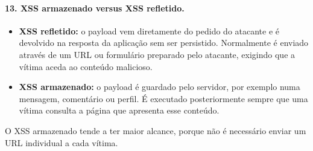 \documentclass[11pt,a4paper]{article}
\begin{document}

\paragraph{13. XSS armazenado versus XSS refletido.}
\begin{itemize}
\item \textbf{XSS refletido:} o payload vem diretamente do pedido do atacante e é devolvido na
resposta da aplicação sem ser persistido. Normalmente é enviado através de um URL ou formulário
preparado pelo atacante, exigindo que a vítima aceda ao conteúdo malicioso.
\item \textbf{XSS armazenado:} o payload é guardado pelo servidor, por exemplo numa mensagem,
comentário ou perfil. É executado posteriormente sempre que uma vítima consulta a página que
apresenta esse conteúdo.
\end{itemize}
O XSS armazenado tende a ter maior alcance, porque não é necessário enviar um URL individual a
cada vítima.
\end{document}
